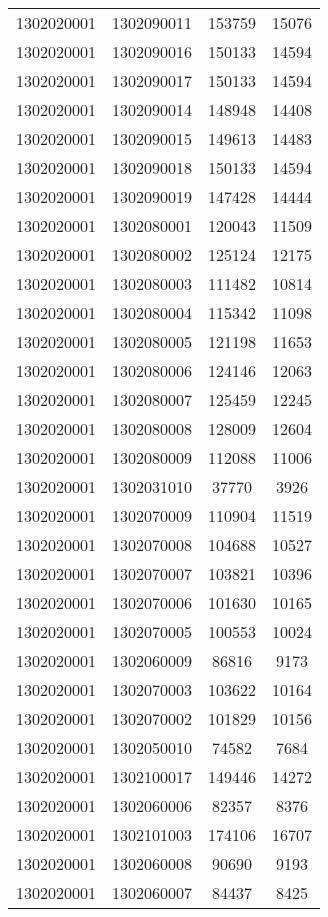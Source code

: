 \begin{longtable}[h]{llcc}
		1302020001 & 1302090011 & 153759 & 15076\\
		1302020001 & 1302090016 & 150133 & 14594\\
		1302020001 & 1302090017 & 150133 & 14594\\
		1302020001 & 1302090014 & 148948 & 14408\\
		1302020001 & 1302090015 & 149613 & 14483\\
		1302020001 & 1302090018 & 150133 & 14594\\
		1302020001 & 1302090019 & 147428 & 14444\\
		1302020001 & 1302080001 & 120043 & 11509\\
		1302020001 & 1302080002 & 125124 & 12175\\
		1302020001 & 1302080003 & 111482 & 10814\\
		1302020001 & 1302080004 & 115342 & 11098\\
		1302020001 & 1302080005 & 121198 & 11653\\
		1302020001 & 1302080006 & 124146 & 12063\\
		1302020001 & 1302080007 & 125459 & 12245\\
		1302020001 & 1302080008 & 128009 & 12604\\
		1302020001 & 1302080009 & 112088 & 11006\\
		1302020001 & 1302031010 & 37770 & 3926\\
		1302020001 & 1302070009 & 110904 & 11519\\
		1302020001 & 1302070008 & 104688 & 10527\\
		1302020001 & 1302070007 & 103821 & 10396\\
		1302020001 & 1302070006 & 101630 & 10165\\
		1302020001 & 1302070005 & 100553 & 10024\\
		1302020001 & 1302060009 & 86816 & 9173\\
		1302020001 & 1302070003 & 103622 & 10164\\
		1302020001 & 1302070002 & 101829 & 10156\\
		1302020001 & 1302050010 & 74582 & 7684\\
		1302020001 & 1302100017 & 149446 & 14272\\
		1302020001 & 1302060006 & 82357 & 8376\\
		1302020001 & 1302101003 & 174106 & 16707\\
		1302020001 & 1302060008 & 90690 & 9193\\
		1302020001 & 1302060007 & 84437 & 8425\\

\end{longtable}
